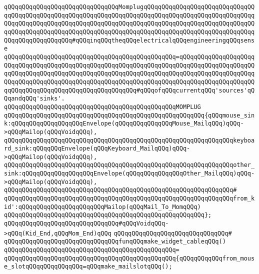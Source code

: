 \verb|qQQqqQQqqQQqqQQqqQQqqQQqqQQqqQQqMomplugqQQqqQQqqQQqqQQqqQQqqQQqqQQqqQQqqQQqqQQqqQQqqQQqqQQqqQQqqQQqqQQqqQQqqQQqqQQqqQQqqQQqqQQqqQQqqQQqqQQqqQQqqQQqqQQqqQQqqQQqqQQqqQQqqQQqqQQqqQQqqQQqqQQqqQQqqQQqqQQqqQQqqQQqqQQqqQQqqQQqqQQqqQQqqQQqqQQqqQQqqQQqqQQqqQQqqQQqqQQqqQQqqQQqqQQqqQQqqQQqqQQqqQQqqQQqqQQqqQQq#qQQqinqQQqtheqQQqelectricalqQQqengineeringqQQqsense|\newline
\verb|qQQqqQQqqQQqqQQqqQQqqQQqqQQqqQQqqQQqqQQqqQQqqQQq=qQQqqQQqqQQqqQQqqQQqqQQqqQQqqQQqqQQqqQQqqQQqqQQqqQQqqQQqqQQqqQQqqQQqqQQqqQQqqQQqqQQqqQQqqQQqqQQqqQQqqQQqqQQqqQQqqQQqqQQqqQQqqQQqqQQqqQQqqQQqqQQqqQQqqQQqqQQqqQQqqQQqqQQqqQQqqQQqqQQqqQQqqQQqqQQqqQQqqQQqqQQqqQQqqQQqqQQqqQQqqQQqqQQqqQQqqQQqqQQqqQQqqQQqqQQqqQQqqQQqqQQqqQQq#qQQqofqQQqcurrentqQQq'sources'qQQqandqQQq'sinks'.|\newline
\verb|qQQqqQQqqQQqqQQqqQQqqQQqqQQqqQQqqQQqqQQqqQQqqQQqMOMPLUG|\newline
\verb|qQQqqQQqqQQqqQQqqQQqqQQqqQQqqQQqqQQqqQQqqQQqqQQqqQQqqQQq{qQQqmouse_sink:qQQqqQQqqQQqqQQqqQQqEnvelope(qQQqqQQqqQQqqQQqMouse_MailqQQq)qQQq->qQQqMailop(qQQqVoidqQQq),|\newline
\verb|qQQqqQQqqQQqqQQqqQQqqQQqqQQqqQQqqQQqqQQqqQQqqQQqqQQqqQQqqQQqqQQqkeyboard_sink:qQQqqQQqEnvelope(qQQqKeyboard_MailqQQq)qQQq->qQQqMailop(qQQqVoidqQQq),|\newline
\verb|qQQqqQQqqQQqqQQqqQQqqQQqqQQqqQQqqQQqqQQqqQQqqQQqqQQqqQQqqQQqqQQqother_sink:qQQqqQQqqQQqqQQqqQQqEnvelope(qQQqqQQqqQQqqQQqOther_MailqQQq)qQQq->qQQqMailop(qQQqVoidqQQq),|\newline
\verb|qQQqqQQqqQQqqQQqqQQqqQQqqQQqqQQqqQQqqQQqqQQqqQQqqQQqqQQqqQQqqQQq#|\newline
\verb|qQQqqQQqqQQqqQQqqQQqqQQqqQQqqQQqqQQqqQQqqQQqqQQqqQQqqQQqqQQqqQQqfrom_kid':qQQqqQQqqQQqqQQqqQQqqQQqMailop(qQQqMail_To_MomqQQq)|\newline
\verb|qQQqqQQqqQQqqQQqqQQqqQQqqQQqqQQqqQQqqQQqqQQqqQQqqQQqqQQq};|\newline
\newline
\verb|qQQqqQQqqQQqqQQqqQQqqQQqqQQqqQQq#qQQqVoidqQQq->qQQq(Kid_End,qQQqMom_End)qQQq|\newline
\verb|qQQqqQQqqQQqqQQqqQQqqQQqqQQqqQQq#|\newline
\verb|qQQqqQQqqQQqqQQqqQQqqQQqqQQqqQQqfunqQQqmake_widget_cableqQQq()|\newline
\verb|qQQqqQQqqQQqqQQqqQQqqQQqqQQqqQQqqQQqqQQqqQQqqQQq=|\newline
\verb|qQQqqQQqqQQqqQQqqQQqqQQqqQQqqQQqqQQqqQQqqQQqqQQq{qQQqqQQqqQQqfrom_mouse_slotqQQqqQQqqQQqqQQq=qQQqmake_mailslotqQQq();|\newline
